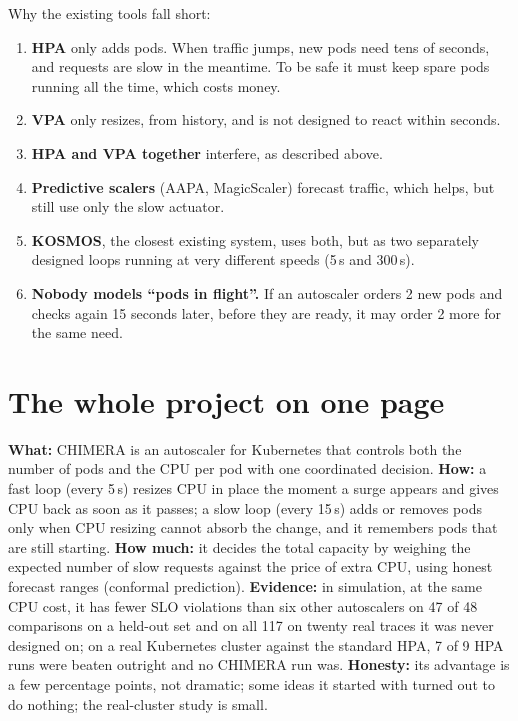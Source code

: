 \documentclass[11pt,a4paper]{article}
\begin{document}
Why the existing tools fall short:
\begin{enumerate}
\item \textbf{HPA} only adds pods. When traffic jumps, new pods need tens of seconds, and
requests are slow in the meantime. To be safe it must keep spare pods running all the
time, which costs money.
\item \textbf{VPA} only resizes, from history, and is not designed to react within
seconds.
\item \textbf{HPA and VPA together} interfere, as described above.
\item \textbf{Predictive scalers} (AAPA, MagicScaler) forecast traffic, which helps, but
still use only the slow actuator.
\item \textbf{KOSMOS}, the closest existing system, uses both, but as two separately
designed loops running at very different speeds (5\,s and 300\,s).
\item \textbf{Nobody models ``pods in flight''.} If an autoscaler orders 2 new pods and
checks again 15 seconds later, before they are ready, it may order 2 more for the same
need.
\end{enumerate}

\section{The whole project on one page}

\begin{idea}
\textbf{What:} CHIMERA is an autoscaler for Kubernetes that controls both the number of pods
and the CPU per pod with one coordinated decision.
\textbf{How:} a fast loop (every 5\,s) resizes CPU in place the moment a surge appears and
gives CPU back as soon as it passes; a slow loop (every 15\,s) adds or removes pods only
when CPU resizing cannot absorb the change, and it remembers pods that are still
starting.
\textbf{How much:} it decides the total capacity by weighing the expected number of slow
requests against the price of extra CPU, using honest forecast ranges (conformal
prediction).
\textbf{Evidence:} in simulation, at the same CPU cost, it has fewer SLO violations than
six other autoscalers on 47 of 48 comparisons on a held-out set and on all 117 on twenty
real traces it was never designed on; on a real Kubernetes cluster against the standard
HPA, 7 of 9 HPA runs were beaten outright and no CHIMERA run was.
\textbf{Honesty:} its advantage is a few percentage points, not dramatic; some ideas it
started with turned out to do nothing; the real-cluster study is small.
\end{idea}
\end{document}
